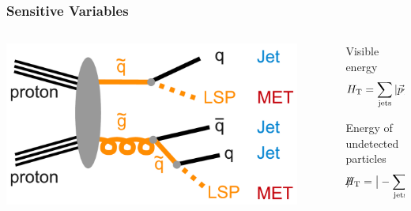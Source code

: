 \documentclass{beamer}
\begin{document}
\begin{frame}
  \frametitle{Sensitive Variables}
  \begin{columns}
    \begin{column}{0.55\textwidth}
      \centering
      \includegraphics[width=0.9\textwidth]{susy/Sketch_All-HadronicSUSYDiagram.pdf}
    \end{column}
    \begin{column}{0.45\textwidth}
      \begin{block}{}
        \textcolor{oochart12}{Visible energy}
        \begin{equation*}
          H_{\text{T}} = \sum_{\text{jets}} \left|\vec{p}_{\text{T}}\right|
        \end{equation*}
      \end{block}
      \begin{block}{}
        \textcolor{oochart11}{Energy of undetected particles}
        \begin{equation*}
          \slash\mkern-12mu{H}_{\text{T}} = \big|-\sum_{\text{jets}} \vec{p}_{\text{T}} \big|
        \end{equation*}
      \end{block}
    \end{column}
  \end{columns}    
\end{frame}
\end{document}
